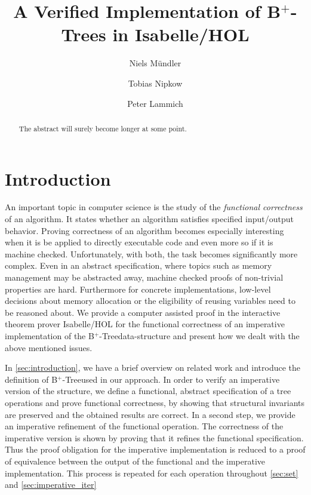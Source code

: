 \documentclass[a4paper,UKenglish,cleveref, autoref, thm-restate]{lipics-v2021}
\title{A Verified Implementation of B$^+$-Trees in Isabelle/HOL} %
\author{Niels Mündler}{Department of Computer Science, ETH Zurich, Switzerland}{n.muendler@tum.de}{https://orcid.org/0000-0003-3851-2557}{}%
\author{Tobias Nipkow}{Department of Informatics, Technical University of Munich, Germany}{nipkow@in.tum.de}{https://orcid.org/0000-0003-0730-515X}{}
\author{Peter Lammich}{Department of Computer Science, The University of Manchester, Great-Britain}{lammich@in.tum.de}{https://orcid.org/0000-0003-3576-0504}{}
\newcommand{\btree}{B$^+$-Tree}
\begin{document}
\maketitle

\begin{abstract}
    The abstract will surely become longer at some point.
\end{abstract}

\section{Introduction}
\label{sec:introduction}


An important topic in computer science is the study of the
\textit{functional correctness} of an algorithm.
It states whether an algorithm satisfies specified
input/output behavior.
Proving correctness of an algorithm
becomes especially interesting when it is be applied
to directly executable code and even more so if it is machine checked.
Unfortunately, with both, the task becomes
significantly more complex.
Even in an abstract specification, where topics such as
memory management may be abstracted away,
machine checked proofs of non-trivial properties
are hard.
Furthermore for concrete implementations,
low-level decisions about memory allocation or
the eligibility of reusing variables need to be
reasoned about.
We provide a computer assisted proof in the interactive
theorem prover Isabelle/HOL \cite{DBLP:books/sp/NipkowPW02} for the functional
correctness of an imperative implementation of the \btree data-structure
and present how we dealt with the above mentioned issues.


In \autoref{sec:introduction}, we have a brief overview on related
work and introduce the definition of \btree used in our approach.
In order to verify an imperative version of the structure,
we define a functional, abstract specification of a tree operations
and prove functional correctness, by showing that structural invariants are preserved
and the obtained results are correct.
In a second step, we provide an imperative refinement
of the functional operation.
The correctness of the imperative version is shown by proving that it refines the functional specification.
Thus the proof obligation for the imperative implementation
is reduced to a proof of equivalence between the output of the
functional and the imperative implementation.
This process is repeated for each operation throughout
\autoref{sec:set} and \autoref{sec:imperative_iter}
\end{document}
